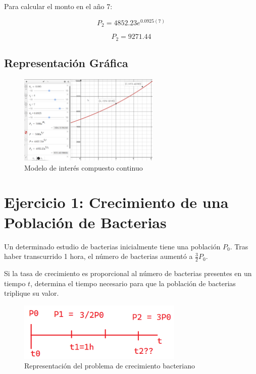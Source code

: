 Para calcular el monto en el año 7:

\[
P_2 = 4852.23 e^{0.0925(7)}
\]

\[
P_2 = 9271.44
\]

\subsection{Representación Gráfica}
\noindent
\begin{figure}[H]
    \centering
    \includegraphics[width=0.6\textwidth]{images/Modelado 01.png}
    \caption{Modelo de interés compuesto continuo}
    \label{fig:modelo-interes}
\end{figure}


\section*{Ejercicio 1: Crecimiento de una Población de Bacterias}

Un determinado estudio de bacterias inicialmente tiene una población \( P_{0} \). Tras haber transcurrido 1 hora, el número de bacterias aumentó a \( \frac{3}{2} P_{0} \). 

Si la tasa de crecimiento es proporcional al número de bacterias presentes en un tiempo \( t \), determina el tiempo necesario para que la población de bacterias triplique su valor.

\begin{figure}[H]
    \centering
    \includegraphics[width=0.7\textwidth]{images/Modelado 02.png}
    \caption{Representación del problema de crecimiento bacteriano}
\end{figure}

